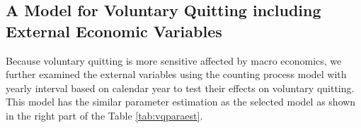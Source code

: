 \documentclass[12pt,letterpaper]{article}
\begin{document}
%	

\subsection{A Model for Voluntary Quitting including External Economic Variables}
Because voluntary quitting is more sensitive affected by macro economics, we further examined the external variables using the counting process model with yearly interval based on calendar year to test their effects on voluntary quitting. This model has the similar parameter estimation as the selected model as shown in the right part of the Table \ref{tab:vqparaest}.
\end{document}
